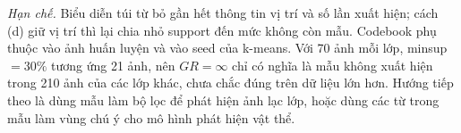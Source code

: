 \emph{Hạn chế.} Biểu diễn túi từ bỏ gần hết thông tin vị trí và số lần xuất hiện; cách (d) giữ vị trí thì lại chia nhỏ support đến mức không còn mẫu. Codebook phụ thuộc vào ảnh huấn luyện và vào seed của k-means. Với 70 ảnh mỗi lớp, minsup $= 30\%$ tương ứng 21 ảnh, nên $GR = \infty$ chỉ có nghĩa là mẫu không xuất hiện trong 210 ảnh của các lớp khác, chưa chắc đúng trên dữ liệu lớn hơn. Hướng tiếp theo là dùng mẫu làm bộ lọc để phát hiện ảnh lạc lớp, hoặc dùng các từ trong mẫu làm vùng chú ý cho mô hình phát hiện vật thể.
